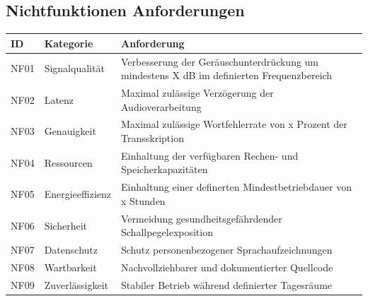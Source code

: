 \documentclass{article}
\begin{document}
\subsection{Nichtfunktionen Anforderungen}
\begin{tabularx}{\textwidth}{ |>{\centering\arraybackslash}p{1.1cm}|>{\raggedright\arraybackslash}p{2.8cm}|>{\raggedright\arraybackslash}X| }
\hline
\rowcolor{Turquoise} 
\arrayrulecolor[HTML]{DB5800}
ID & Kategorie & Anforderung \\
\hline
         NF01 & Signalqualität & Verbesserung der Geräuschunterdrückung um mindestens X dB im definierten Frequenzbereich \\   %
\hline
         NF02 & Latenz & Maximal zulässige Verzögerung der Audioverarbeitung\\
\hline
         NF03 & Genauigkeit & Maximal zulässige Wortfehlerrate von x Prozent der Transskription \\     %
\hline
         NF04 & Ressourcen & Einhaltung der verfügbaren Rechen- und Speicherkapazitäten \\
\hline
         NF05 & Energieeffizienz & Einhaltung einer definerten Mindestbetriebdauer von x Stunden \\  %
\hline
         NF06 & Sicherheit & Vermeidung gesundheitsgefährdender Schallpegelexposition \\
\hline
         NF07 & Datenschutz & Schutz personenbezogener Sprachaufzeichnungen \\
\hline
         NF08 & Wartbarkeit & Nachvollziehbarer und dokumentierter Quellcode\\
\hline
         NF09 & Zuverlässigkeit & Stabiler Betrieb während definierter Tagesräume \\
\hline
\end{tabularx}
\end{document}
